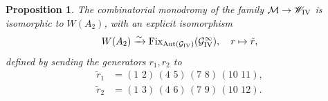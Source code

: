 \documentclass[a4paper,reqno]{amsart}
\numberwithin{equation}{section}
\newtheorem{proposition}[theorem]{Proposition}
\numberwithin{equation}{section}
\begin{document}
\begin{proposition} \label{prop:combinatorialmonodromyPIV}
    The combinatorial monodromy of the family $\mathcal{M}\to \mathscr{W}_{\rm{IV}}$ is isomorphic to $W(A_2)$, with an explicit isomorphism
    \begin{equation*}
        W(A_2) \xrightarrow{\sim}   \operatorname{Fix}_{\operatorname{Aut}(\mathcal{G}_{\rm{IV}})}(\mathcal{G}_{\rm{IV}}^\infty), \quad r\mapsto \tilde{r},
    \end{equation*}
defined by sending the generators $r_1,r_2$ to
\begin{align*}
    \tilde{r}_1&= (1\,\, 2)\,(4\,\,5)\,(7\,\,8)\,(10\,\,11),\\
    \tilde{r}_2&= (1\,\, 3)\,(4\,\,6)\,(7\,\,9)\,(10\,\,12).
\end{align*}
\end{proposition}
\end{document}
